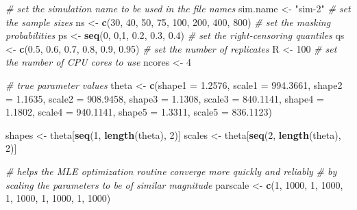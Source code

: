 \documentclass[
]{article}
\newenvironment{Shaded}{\begin{snugshade}}{\end{snugshade}}
\newcommand{\CommentTok}[1]{\textcolor[rgb]{0.56,0.35,0.01}{\textit{#1}}}
\newcommand{\DataTypeTok}[1]{\textcolor[rgb]{0.13,0.29,0.53}{#1}}
\newcommand{\DecValTok}[1]{\textcolor[rgb]{0.00,0.00,0.81}{#1}}
\newcommand{\FloatTok}[1]{\textcolor[rgb]{0.00,0.00,0.81}{#1}}
\newcommand{\KeywordTok}[1]{\textcolor[rgb]{0.13,0.29,0.53}{\textbf{#1}}}
\newcommand{\NormalTok}[1]{#1}
\newcommand{\StringTok}[1]{\textcolor[rgb]{0.31,0.60,0.02}{#1}}
\begin{document}
\begin{Shaded}
\begin{Highlighting}[]
\CommentTok{\# set the simulation name to be used in the file names}
\NormalTok{sim.name \textless{}{-}}\StringTok{ "sim{-}2"}
\CommentTok{\# set the sample sizes}
\NormalTok{ns \textless{}{-}}\StringTok{ }\KeywordTok{c}\NormalTok{(}\DecValTok{30}\NormalTok{, }\DecValTok{40}\NormalTok{, }\DecValTok{50}\NormalTok{, }\DecValTok{75}\NormalTok{, }\DecValTok{100}\NormalTok{, }\DecValTok{200}\NormalTok{, }\DecValTok{400}\NormalTok{, }\DecValTok{800}\NormalTok{)}
\CommentTok{\# set the masking probabilities}
\NormalTok{ps \textless{}{-}}\StringTok{ }\KeywordTok{seq}\NormalTok{(}\DecValTok{0}\NormalTok{, }\DecValTok{0}\NormalTok{,}\DecValTok{1}\NormalTok{, }\FloatTok{0.2}\NormalTok{, }\FloatTok{0.3}\NormalTok{, }\FloatTok{0.4}\NormalTok{)}
\CommentTok{\# set the right{-}censoring quantiles}
\NormalTok{qs \textless{}{-}}\StringTok{ }\KeywordTok{c}\NormalTok{(}\FloatTok{0.5}\NormalTok{, }\FloatTok{0.6}\NormalTok{, }\FloatTok{0.7}\NormalTok{, }\FloatTok{0.8}\NormalTok{, }\FloatTok{0.9}\NormalTok{, }\FloatTok{0.95}\NormalTok{)}
\CommentTok{\# set the number of replicates}
\NormalTok{R \textless{}{-}}\StringTok{ }\DecValTok{100}
\CommentTok{\# set the number of CPU cores to use}
\NormalTok{ncores \textless{}{-}}\StringTok{ }\DecValTok{4}

\CommentTok{\# true parameter values}
\NormalTok{theta \textless{}{-}}\StringTok{ }\KeywordTok{c}\NormalTok{(}\DataTypeTok{shape1 =} \FloatTok{1.2576}\NormalTok{, }\DataTypeTok{scale1 =} \FloatTok{994.3661}\NormalTok{,}
           \DataTypeTok{shape2 =} \FloatTok{1.1635}\NormalTok{, }\DataTypeTok{scale2 =} \FloatTok{908.9458}\NormalTok{,}
           \DataTypeTok{shape3 =} \FloatTok{1.1308}\NormalTok{, }\DataTypeTok{scale3 =} \FloatTok{840.1141}\NormalTok{,}
           \DataTypeTok{shape4 =} \FloatTok{1.1802}\NormalTok{, }\DataTypeTok{scale4 =} \FloatTok{940.1141}\NormalTok{,}
           \DataTypeTok{shape5 =} \FloatTok{1.3311}\NormalTok{, }\DataTypeTok{scale5 =} \FloatTok{836.1123}\NormalTok{)}

\NormalTok{shapes \textless{}{-}}\StringTok{ }\NormalTok{theta[}\KeywordTok{seq}\NormalTok{(}\DecValTok{1}\NormalTok{, }\KeywordTok{length}\NormalTok{(theta), }\DecValTok{2}\NormalTok{)]}
\NormalTok{scales \textless{}{-}}\StringTok{ }\NormalTok{theta[}\KeywordTok{seq}\NormalTok{(}\DecValTok{2}\NormalTok{, }\KeywordTok{length}\NormalTok{(theta), }\DecValTok{2}\NormalTok{)]}

\CommentTok{\# helps the MLE optimization routine converge more quickly and reliably}
\CommentTok{\# by scaling the parameters to be of similar magnitude}
\NormalTok{parscale \textless{}{-}}\StringTok{ }\KeywordTok{c}\NormalTok{(}\DecValTok{1}\NormalTok{, }\DecValTok{1000}\NormalTok{, }\DecValTok{1}\NormalTok{, }\DecValTok{1000}\NormalTok{, }\DecValTok{1}\NormalTok{, }\DecValTok{1000}\NormalTok{, }\DecValTok{1}\NormalTok{, }\DecValTok{1000}\NormalTok{, }\DecValTok{1}\NormalTok{, }\DecValTok{1000}\NormalTok{)}


\end{Highlighting}
\end{Shaded}
\end{document}
